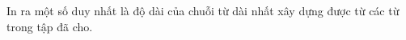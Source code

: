 In ra một số duy nhất là độ dài của chuỗi từ dài nhất xây dựng được từ các từ trong tập đã cho.  

\